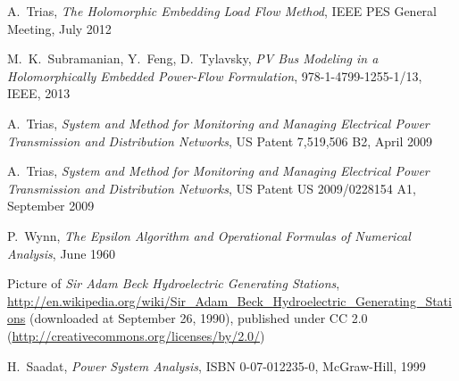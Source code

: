 \begin{thebibliography}{1}
	A.~Trias, \emph{The Holomorphic Embedding Load Flow Method}, IEEE PES General Meeting, July 2012
	
	M.~K.~Subramanian, Y.~Feng, D.~Tylavsky, \emph{PV Bus Modeling in a Holomorphically Embedded Power-Flow Formulation}, 978-1-4799-1255-1/13, IEEE, 2013
	
	A.~Trias, \emph{System and Method for Monitoring and Managing Electrical Power Transmission and Distribution Networks}, US Patent 7,519,506 B2, April 2009
	
	A.~Trias, \emph{System and Method for Monitoring and Managing Electrical Power Transmission and Distribution Networks}, US Patent US 2009/0228154 A1, September 2009
				
	P.~Wynn, \emph{The Epsilon Algorithm and Operational Formulas of Numerical Analysis}, June 1960	
	
	Picture of \emph{Sir Adam Beck Hydroelectric Generating Stations}, \url{http://en.wikipedia.org/wiki/Sir_Adam_Beck_Hydroelectric_Generating_Stations} (downloaded at September 26, 1990), published under CC 2.0 (\url{http://creativecommons.org/licenses/by/2.0/})
	
	H.~Saadat, \emph{Power System Analysis}, ISBN 0-07-012235-0, McGraw-Hill, 1999
\end{thebibliography}